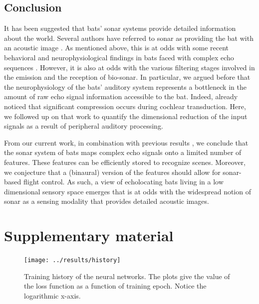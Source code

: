 \documentclass[preprint,5p]{elsarticle}
\begin{document}
\subsection{Conclusion}

It has been suggested that bats' sonar systems provide detailed information about the world. Several authors have referred to sonar as providing the bat with an acoustic image \citep{Lee2017,Barchi2013,Moss2001,Schnitzler2003,Simmons2012,Ulanovsky2008,Clare2015,Surlykke2016,Geipel2013}. As mentioned above, this is at odds with some recent behavioral and neurophysiological findings in bats faced with complex echo sequences \citep{Knowles2015,Geberl2013,Warnecke2018}. However, it is also at odds with the various filtering stages involved in the emission and the reception of bio-sonar. In particular, we argued before that the neurophysiology of the bats' auditory system represents a bottleneck in the amount of raw echo signal information accessible to the bat. Indeed, \citet{Reijniers2010a} already noticed that significant compression occurs during cochlear transduction. Here, we followed up on that work to quantify the dimensional reduction of the input signals as a result of peripheral auditory processing.

From our current work, in combination with previous results \citep{Vanderelst2016,Vanderelst2015a,Mansour2019,Reijniers2010a}, we conclude that the sonar system of bats maps complex echo signals onto a limited number of features. These features can be efficiently stored to recognize scenes. Moreover, we conjecture that a (binaural) version of the features should allow for sonar-based flight control. As such, a view of echolocating bats living in a low dimensional sensory space emerges that is at odds with the widespread notion of sonar as a sensing modality that provides detailed acoustic images.



\onecolumn
\appendix
\section{Supplementary material}

\begin{figure}[h]
	\centering
	\texttt{[image: ../results/history]}
	\caption{Training history of the neural networks. The plots give the value of the loss function as a function of training epoch. Notice the logarithmic x-axis.}
	\label{fig:history}
\end{figure}
\end{document}
